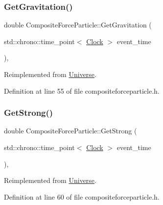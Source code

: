 \subsubsection{\texorpdfstring{Get\+Gravitation()}{GetGravitation()}}
{\footnotesize\ttfamily double Composite\+Force\+Particle\+::\+Get\+Gravitation (\begin{DoxyParamCaption}\item[{std\+::chrono\+::time\+\_\+point$<$ \mbox{\hyperlink{universe_8h_a0ef8d951d1ca5ab3cfaf7ab4c7a6fd80}{Clock}} $>$}]{event\+\_\+time }\end{DoxyParamCaption})\hspace{0.3cm}{\ttfamily [inline]}, {\ttfamily [virtual]}}



Reimplemented from \mbox{\hyperlink{class_universe_ab0404e774ee0ed66b597ff5b8e989446}{Universe}}.



Definition at line 55 of file compositeforceparticle.\+h.

\mbox{\label{class_composite_force_particle_a9818d469c9841eaf77fbe329b0953354}} 
\subsubsection{\texorpdfstring{Get\+Strong()}{GetStrong()}}
{\footnotesize\ttfamily double Composite\+Force\+Particle\+::\+Get\+Strong (\begin{DoxyParamCaption}\item[{std\+::chrono\+::time\+\_\+point$<$ \mbox{\hyperlink{universe_8h_a0ef8d951d1ca5ab3cfaf7ab4c7a6fd80}{Clock}} $>$}]{event\+\_\+time }\end{DoxyParamCaption})\hspace{0.3cm}{\ttfamily [inline]}, {\ttfamily [virtual]}}



Reimplemented from \mbox{\hyperlink{class_universe_acb453ce71da418c5b5617fecede9571b}{Universe}}.



Definition at line 60 of file compositeforceparticle.\+h.

\mbox{\label{class_composite_force_particle_abc8597f3b4f7cf755ab4618bd624b046}} 
